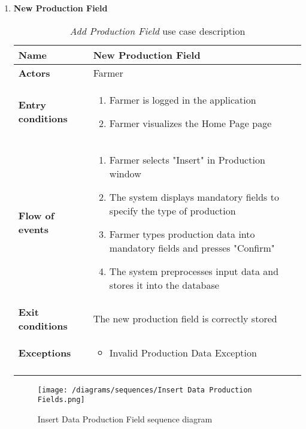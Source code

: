 \begin{enumerate}
				\FloatBarrier
				\newpage
			\item \textbf{New Production Field}
				\begin{longtable}{p{0.26\linewidth}p{0.75\linewidth}}
					\toprule
					\textbf{Name} & \textbf{New Production Field} \\
					\midrule
					\textbf{Actors} & Farmer \\
					\midrule
					\textbf{Entry conditions} & \begin{enumerate}
													\item Farmer is logged in the application
													\item Farmer visualizes the Home Page page
												\end{enumerate} \\
					\midrule
					\textbf{Flow of events} & 
					\begin{enumerate}
						\item Farmer selects "Insert" in Production window
						\item The system displays mandatory fields to specify the type of production 
						\item Farmer types production data into mandatory fields and presses "Confirm"
						\item The system preprocesses input data and stores it into the database
					\end{enumerate} \\
					\midrule
					\textbf{Exit conditions} & The new production field is correctly stored\\
					\midrule
					\textbf{Exceptions} & 
					\begin{itemize}
						\item Invalid Production Data Exception
					\end{itemize} \\
					\bottomrule
					\caption{\emph{Add Production Field} use case description}
				\end{longtable}
			
				\begin{figure}[h]
					\centering 
					\texttt{[image: /diagrams/sequences/Insert Data Production Fields.png]}
					\caption{Insert Data Production Field sequence diagram}
				\end{figure}
			

\end{enumerate}
